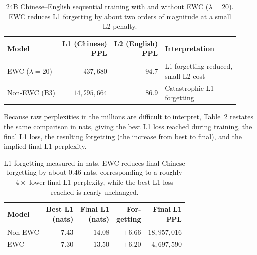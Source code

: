 \begin{table}[t]
\centering
\small
\begin{adjustbox}{max width=\columnwidth}
\begin{tabular}{@{}lrrl@{}}
\toprule
Model & \makecell[r]{L1 (Chinese)\\PPL} & \makecell[r]{L2 (English)\\PPL} & Interpretation \\
\midrule
EWC ($\lambda{=}20$) & $437{,}680$    & $94.7$ & \makecell[l]{L1 forgetting reduced,\\small L2 cost} \\
\addlinespace
Non-EWC (B3) & $14{,}295{,}664$ & $86.9$ & \makecell[l]{Catastrophic L1\\forgetting} \\
\bottomrule
\end{tabular}
\end{adjustbox}
\caption{$24$B Chinese--English sequential training with and without
EWC ($\lambda = 20$). EWC reduces L1 forgetting by about two orders of
magnitude at a small L2 penalty.}
\label{tab:ewc-24b}
\end{table}

Because raw perplexities in the millions are difficult to interpret,
Table~\ref{tab:ewc-nats} restates the same comparison in nats, giving
the best L1 loss reached during training, the final L1 loss, the
resulting forgetting (the increase from best to final), and the
implied final L1 perplexity.

\begin{table}[t]
\centering
\small
\begin{adjustbox}{max width=\columnwidth}
\begin{tabular}{@{}lrrrr@{}}
\toprule
Model & \makecell[r]{Best L1\\(nats)} & \makecell[r]{Final L1\\(nats)} & \makecell[r]{For-\\getting} & \makecell[r]{Final L1\\PPL} \\
\midrule
Non-EWC & $7.43$ & $14.08$ & $+6.66$ & $18{,}957{,}016$ \\
EWC     & $7.30$ & $13.50$ & $+6.20$ & $4{,}697{,}590$ \\
\bottomrule
\end{tabular}
\end{adjustbox}
\caption{L1 forgetting measured in nats. EWC reduces final Chinese
forgetting by about $0.46$ nats, corresponding to a roughly $4\times$
lower final L1 perplexity, while the best L1 loss reached is nearly
unchanged.}
\label{tab:ewc-nats}
\end{table}

